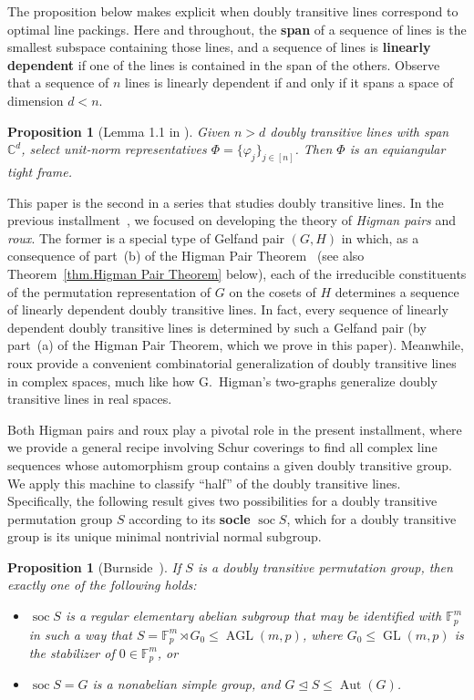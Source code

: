 \documentclass[11pt]{article}
\newtheorem{proposition}[theo]{Proposition}
\theoremstyle{definition}
\numberwithin{equation}{section}
\begin{document}
The proposition below makes explicit when doubly transitive lines correspond to optimal line packings.
Here and throughout, the \textbf{span} of a sequence of lines is the smallest subspace containing those lines, and a sequence of lines is \textbf{linearly dependent} if one of the lines is contained in the span of the others.
Observe that a sequence of $n$ lines is linearly dependent if and only if it spans a space of dimension $d < n$.


\begin{proposition}[Lemma 1.1 in \cite{IversonM:18}]
\label{prop: 2tran implies ETF}
Given $n >d$ doubly transitive lines with span~$\mathbb{C}^d$, select unit-norm representatives $\Phi = \{\varphi_j\}_{j\in[n]}$.
Then $\Phi$ is an equiangular tight frame.
\end{proposition}

This paper is the second in a series that studies doubly transitive lines.
In the previous installment~\cite{IversonM:18}, we focused on developing the theory of \textit{Higman pairs} and \textit{roux}.
The former is a special type of Gelfand pair $(G,H)$ in which, as a consequence of part~(b) of the Higman Pair Theorem~\cite{IversonM:18} (see also Theorem~\ref{thm.Higman Pair Theorem} below), each of the irreducible constituents of the permutation representation of $G$ on the cosets of $H$ determines a sequence of linearly dependent doubly transitive lines.
In fact, every sequence of linearly dependent doubly transitive lines is determined by such a Gelfand pair (by part~(a) of the Higman Pair Theorem, which we prove in this paper).
Meanwhile, roux provide a convenient combinatorial generalization of doubly transitive lines in complex spaces, much like how G.~Higman's two-graphs generalize doubly transitive lines in real spaces.

Both Higman pairs and roux play a pivotal role in the present installment, where we provide a general recipe involving Schur coverings to find all complex line sequences whose automorphism group contains a given doubly transitive group.
We apply this machine to classify ``half'' of the doubly transitive lines.
Specifically, the following result gives two possibilities for a doubly transitive permutation group $S$ according to its \textbf{socle} $\operatorname{soc} S$, which for a doubly transitive group is its unique minimal nontrivial normal subgroup.

\begin{proposition}[Burnside~\cite{Burnside:97}]
\label{prop: Burnside}
If $S$ is a doubly transitive permutation group, then exactly one of the following holds:
\begin{itemize}
\item[(I)]
$\operatorname{soc} S$ is a regular elementary abelian subgroup that may be identified with $\mathbb{F}_p^m$ in such a way that $S = \mathbb{F}_p^m \rtimes G_0 \leq \operatorname{AGL}(m,p)$, where $G_0 \leq \operatorname{GL}(m,p)$ is the stabilizer of $0 \in \mathbb{F}_p^m$, or
\item[(II)]
$\operatorname{soc} S = G$ is a nonabelian simple group, and $G\unlhd S\leq\operatorname{Aut}(G)$.
\end{itemize}
\end{proposition}
\end{document}

